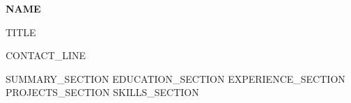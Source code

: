 \documentclass[letterpaper]{article}
\renewcommand{\normalsize}{\fontsize{10pt}{12pt}\selectfont}
\begin{document}
\begin{center}
    \fontsize{17pt}{20pt}\selectfont\textbf{{{NAME}}}

    \vspace{3pt}
    \normalsize
    {{TITLE}}

    \vspace{5pt}
    \small
    {{CONTACT_LINE}}
\end{center}

{{SUMMARY_SECTION}}
{{EDUCATION_SECTION}}
{{EXPERIENCE_SECTION}}
{{PROJECTS_SECTION}}
{{SKILLS_SECTION}}
\end{document}
